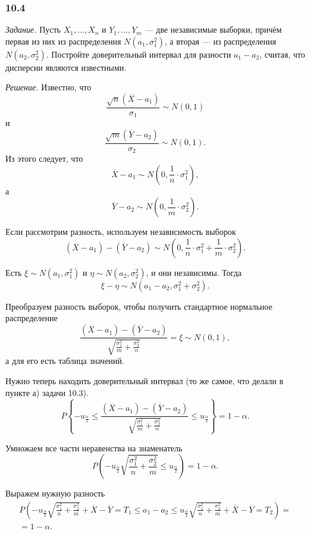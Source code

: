 \subsubsection*{10.4}

\textit{Задание.}
Пусть $X_1, \dotsc, X_n$ и $Y_1, \dotsc, Y_m$ --- две независимые выборки,
причём первая из них из распределения $N \left( a_1, \sigma_1^2 \right) $, а вторая ---
из распределения $N \left( a_2, \sigma_2^2 \right) $.
Постройте доверительный интервал для разности $a_1 - a_2$, считая,
что дисперсии являются известными.

\textit{Решение.} Известно, что
$$ \frac{ \sqrt{n} \left( \overline{X} - a_1 \right) }{ \sigma_1} \sim
  N \left( 0, 1 \right) $$
и
$$ \frac{ \sqrt{m} \left( \overline{Y} - a_2 \right) }{ \sigma_2} \sim
  N \left( 0, 1 \right).$$
Из этого следует, что
$$ \overline{X} - a_1 \sim
  N \left( 0, \frac{1}{n} \cdot \sigma_1^2 \right),$$
а
$$ \overline{Y} - a_2 \sim
  N \left( 0, \frac{1}{m} \cdot \sigma_2^2 \right).$$

Если рассмотрим разность, используем независимость выборок
$$ \left( \overline{X} - a_1 \right) - \left( \overline{Y} - a_2 \right) \sim
  N \left( 0, \frac{1}{n} \cdot \sigma_1^2 + \frac{1}{m} \cdot \sigma_2^2 \right).$$

Есть $ \xi \sim N \left( a_1, \sigma_1^2 \right) $ и $ \eta \sim N \left( a_2, \sigma_2^2 \right) $,
и они независимы.
Тогда
$$ \xi - \eta \sim
  N \left( a_1 - a_2, \sigma_1^2 + \sigma_2^2 \right).$$

Преобразуем разность выборок, чтобы получить стандартное нормальное распределение
$$ \frac{ \left( \overline{X} - a_1 \right) - \left( \overline{Y} - a_2 \right) }{ \sqrt{ \frac{ \sigma_1^2}{m} + \frac{ \sigma_2^2}{n}}} =
  \xi \sim
  N \left( 0, 1 \right),$$
а для его есть таблица значений.

Нужно теперь находить доверительный интервал (то же самое, что делали в пункте а) задачи 10.3).
$$P \left\{
    -u_{ \frac{ \alpha }{2}} \leq
    \frac{ \left( \overline{X} - a_1 \right) - \left( \overline{Y} - a_2 \right) }{ \sqrt{ \frac{ \sigma_1^2}{m} + \frac{ \sigma_2^2}{n}}} \leq
    u_{ \frac{ \alpha }{2}}
  \right\} =
  1 - \alpha.$$

Умножаем все части неравенства на знаменатель
$$P \left(
    -u_{ \frac{ \alpha }{2}} \sqrt{ \frac{ \sigma_1^2}{n} + \frac{\sigma_2^2}{m}} \leq
    u_{ \frac{ \alpha }{2}}
  \right) =
  1 - \alpha.$$

Выражем нужную разность
\begin{equation*}
  \begin{split}
    P \left(
      -u_{ \frac{ \alpha }{2}} \sqrt{ \frac{ \sigma_1^2}{n} + \frac{ \sigma_2^2}{m}} + \overline{X} -
      \overline{Y} = T_1 \leq
      a_1 - a_2 \leq
      u_{ \frac{ \alpha }{2}} \sqrt{ \frac{ \sigma_1^2}{n} + \frac{ \sigma_2^2}{m}} + \overline{X} -
      \overline{Y} = T_2
    \right) = \\
    = 1 - \alpha.
  \end{split}
\end{equation*}

